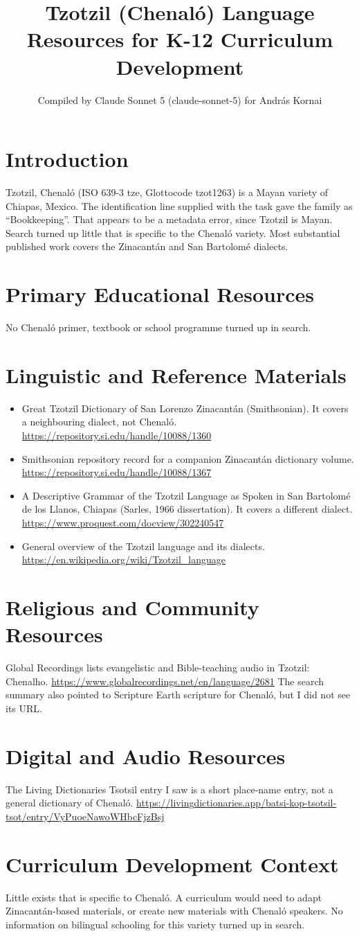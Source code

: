 \documentclass[12pt]{article}
\title{Tzotzil (Chenal\'o) Language Resources for K-12 Curriculum Development}
\author{Compiled by Claude Sonnet 5 (claude-sonnet-5) for Andr\'as Kornai}
\date{}
\begin{document}
\maketitle
\section{Introduction}
Tzotzil, Chenal\'o (ISO 639-3 tze, Glottocode tzot1263) is a Mayan variety of Chiapas, Mexico. The identification line supplied with the task gave the family as ``Bookkeeping''. That appears to be a metadata error, since Tzotzil is Mayan. Search turned up little that is specific to the Chenal\'o variety. Most substantial published work covers the Zinacant\'an and San Bartolom\'e dialects.
\section{Primary Educational Resources}
No Chenal\'o primer, textbook or school programme turned up in search.
\section{Linguistic and Reference Materials}
\begin{itemize}
\item Great Tzotzil Dictionary of San Lorenzo Zinacant\'an (Smithsonian). It covers a neighbouring dialect, not Chenal\'o. \url{https://repository.si.edu/handle/10088/1360}
\item Smithsonian repository record for a companion Zinacant\'an dictionary volume. \url{https://repository.si.edu/handle/10088/1367}
\item A Descriptive Grammar of the Tzotzil Language as Spoken in San Bartolom\'e de los Llanos, Chiapas (Sarles, 1966 dissertation). It covers a different dialect. \url{https://www.proquest.com/docview/302240547}
\item General overview of the Tzotzil language and its dialects. \url{https://en.wikipedia.org/wiki/Tzotzil_language}
\end{itemize}
\section{Religious and Community Resources}
Global Recordings lists evangelistic and Bible-teaching audio in Tzotzil: Chenalho. \url{https://www.globalrecordings.net/en/language/2681} The search summary also pointed to Scripture Earth scripture for Chenal\'o, but I did not see its URL.
\section{Digital and Audio Resources}
The Living Dictionaries Tsotsil entry I saw is a short place-name entry, not a general dictionary of Chenal\'o. \url{https://livingdictionaries.app/batsi-kop-tsotsil-tsot/entry/VyPuoeNawoWHbcFjzBsj}
\section{Curriculum Development Context}
Little exists that is specific to Chenal\'o. A curriculum would need to adapt Zinacant\'an-based materials, or create new materials with Chenal\'o speakers. No information on bilingual schooling for this variety turned up in search.
\end{document}

